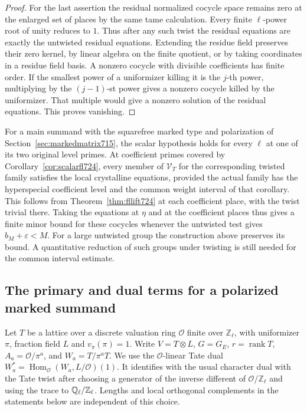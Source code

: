 \documentclass[a4paper,11pt]{article}
\theoremstyle{definition}
\theoremstyle{remark}
\newcommand{\ZZ}{\mathbb Z}\newcommand{\ord}{\operatorname{ord}}
\numberwithin{equation}{section}
\begin{document}
\begin{proof}
For the last assertion the residual normalized cocycle space remains
zero at the enlarged set of places by the same tame calculation.
Every finite \(\ell\)-power root of unity reduces to \(1\).
Thus after any such twist the residual equations are exactly the
untwisted residual equations. Extending the residue field preserves
their zero kernel, by linear algebra on the finite quotient, or by
taking coordinates in a residue field basis. A nonzero cocycle with
divisible coefficients has finite order. If the smallest power of a
uniformizer killing it is the \(j\)-th power, multiplying by the
\((j-1)\)-st power gives a nonzero cocycle killed by the uniformizer.
That multiple would
give a nonzero solution of the residual equations. This proves
vanishing.
\end{proof}

For a main summand with the squarefree marked type and polarization
of Section~\ref{sec:markedmatrix715}, the scalar hypothesis holds
for every \(\ell\) at one of its two original level primes. At coefficient
primes covered by Corollary~\ref{cor:scalarfl724}, every member of
\(\mathcal V_T\) for the corresponding twisted family satisfies the
local crystalline equations, provided the actual family has the
hyperspecial coefficient level and the common weight interval of that
corollary. This follows from Theorem~\ref{thm:fllift724} at each
coefficient place, with the twist trivial there. Taking the equations
at \(\eta\) and at the coefficient places thus gives a finite minor
bound for these cocycles whenever the untwisted test gives
\(b_M+\varepsilon<M\). For a large untwisted group the construction
above preserves its bound. A quantitative reduction of such groups
under twisting is still needed for the common interval estimate.
\clearpage

\subsection{The primary and dual terms for a polarized marked summand}
\label{sec:polarizedlength728}

Let \(T\) be a lattice over a discrete valuation ring \(\mathcal O\)
finite over \(\ZZ_\ell\), with uniformizer \(\pi\), fraction field \(L\)
and \(v_\pi(\pi)=1\). Write \(V=T\otimes L\), \(G=G_E\),
\(r=\operatorname{rank}T\), \(A_a=\mathcal O/\pi^a\), and
\(W_a=T/\pi^aT\). We use the \(\mathcal O\)-linear Tate dual
\(W_a^*=\operatorname{Hom}_{\mathcal O}(W_a,L/\mathcal O)(1)\).
It identifies with the usual character dual with the Tate twist
after choosing a generator of the inverse different of
\(\mathcal O/\ZZ_\ell\) and using the trace to
\(\QQ_\ell/\ZZ_\ell\). Lengths and local orthogonal complements in the
statements below are independent of this choice.
\end{document}
